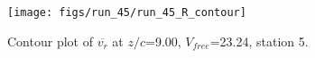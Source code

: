 \begin{figure}[H]
\centering
\texttt{[image: figs/run\_45/run\_45\_R\_contour]}
\caption{Contour plot of $\overline{v_{r}}$ at $z/c$=9.00, $V_{free}$=23.24, station 5.}
\label{fig:run_45_R_contour}
\end{figure}


